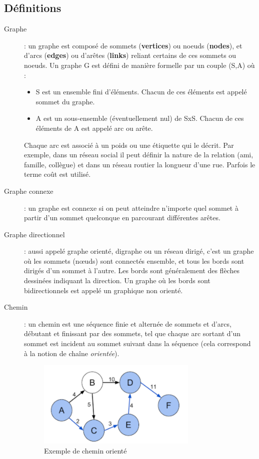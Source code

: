 \subsection{Définitions}
\begin{description}
\item[Graphe]  : un graphe est composé de sommets (\textbf{vertices}) ou noeuds (\textbf{nodes}), et d'arcs (\textbf{edges}) ou d'arêtes (\textbf{links}) reliant certains de ces sommets ou noeuds.
Un graphe G est défini de manière formelle par un couple (S,A) où :
\begin{itemize}
	\item S est un ensemble fini d'éléments. Chacun de ces éléments est appelé sommet du graphe.
	\item A est un sous-ensemble (éventuellement nul) de SxS. Chacun de ces éléments de A est appelé arc ou arête.
\end{itemize}
Chaque arc est associé à un poids ou une étiquette qui le décrit. Par exemple, dans un réseau social il peut définir la nature de la relation (ami, famille, collègue) et dans un réseau routier la longueur d'une rue. Parfois le terme coût est utilisé.

\item[Graphe connexe] : un graphe est connexe si on peut atteindre n'importe quel sommet à partir d'un sommet quelconque en parcourant différentes arêtes.

\item[Graphe directionnel] : aussi appelé graphe orienté, digraphe ou un réseau dirigé, c'est un graphe où les sommets (nœuds) sont connectés ensemble, et tous les bords sont dirigés d'un sommet à l'autre. Les bords sont généralement des flèches dessinées indiquant la direction.
Un graphe où les bords sont bidirectionnels est appelé un graphique non orienté.

\item[Chemin] : un chemin est une séquence finie et alternée de sommets et d'arcs, débutant et finissant par des sommets, tel que chaque arc sortant d'un sommet est incident au sommet suivant dans la séquence (cela correspond à la notion de chaîne \emph{orientée}).
\begin{figure}[h]
	\centering
	\includegraphics[width=0.75\textwidth]{img/cheminGraphe.png}
	\caption{Exemple de chemin orienté}
\end{figure}
\end{description}

